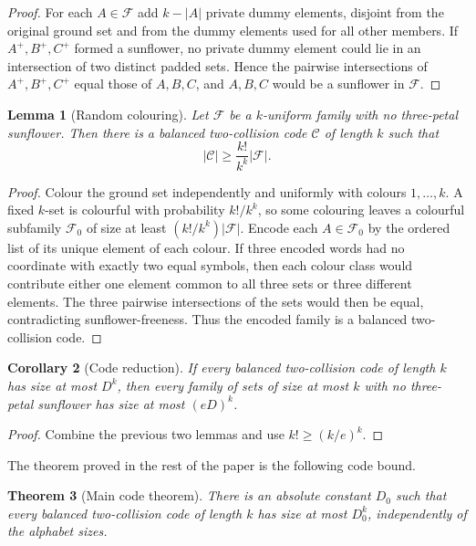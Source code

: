\documentclass[11pt]{article}
\newtheorem{theorem}{Theorem}[section]
\newtheorem{lemma}[theorem]{Lemma}
\newtheorem{corollary}[theorem]{Corollary}
\theoremstyle{remark}
\newcommand{\C}{\mathcal C}
\newcommand{\F}{\mathcal F}
\begin{document}
\begin{proof}
For each $A\in\F$ add $k-|A|$ private dummy elements, disjoint from the original ground set and from the dummy elements used for all other members.  If $A^+,B^+,C^+$ formed a sunflower, no private dummy element could lie in an intersection of two distinct padded sets.  Hence the pairwise intersections of $A^+,B^+,C^+$ equal those of $A,B,C$, and $A,B,C$ would be a sunflower in $\F$.
\end{proof}

\begin{lemma}[Random colouring]
Let $\F$ be a $k$-uniform family with no three-petal sunflower.  Then there is a balanced two-collision code $\C$ of length $k$ such that
\[
        |\C|\ge \frac{k!}{k^k}|\F|.
\]
\end{lemma}

\begin{proof}
Colour the ground set independently and uniformly with colours $1,\ldots,k$.  A fixed $k$-set is colourful with probability $k!/k^k$, so some colouring leaves a colourful subfamily $\F_0$ of size at least $(k!/k^k)|\F|$.  Encode each $A\in\F_0$ by the ordered list of its unique element of each colour.  If three encoded words had no coordinate with exactly two equal symbols, then each colour class would contribute either one element common to all three sets or three different elements.  The three pairwise intersections of the sets would then be equal, contradicting sunflower-freeness.  Thus the encoded family is a balanced two-collision code.
\end{proof}

\begin{corollary}[Code reduction]\label{cor:code-reduction}
If every balanced two-collision code of length $k$ has size at most $D^k$, then every family of sets of size at most $k$ with no three-petal sunflower has size at most $(eD)^k$.
\end{corollary}

\begin{proof}
Combine the previous two lemmas and use $k!\ge (k/e)^k$.
\end{proof}

The theorem proved in the rest of the paper is the following code bound.

\begin{theorem}[Main code theorem]\label{thm:main-code}
There is an absolute constant $D_0$ such that every balanced two-collision code of length $k$ has size at most $D_0^k$, independently of the alphabet sizes.
\end{theorem}
\end{document}
